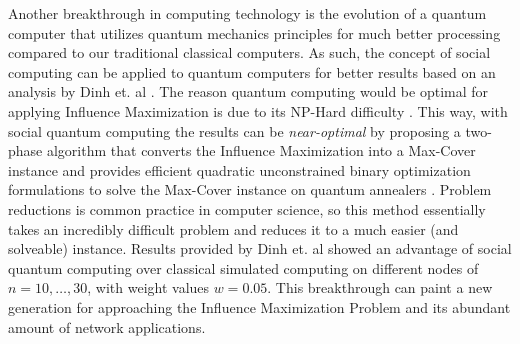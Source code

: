 \documentclass[12pt]{article}
\begin{document}
Another breakthrough in computing technology is the evolution of a quantum computer that utilizes quantum mechanics principles for much better processing compared to our traditional classical computers. 
As such, the concept of social computing can be applied to quantum computers for better results based on an analysis by Dinh et. al \cite{10000698}. 
The reason quantum computing would be optimal for applying Influence Maximization is due to its NP-Hard difficulty \cite{10000698}. 
This way, with social quantum computing the results can be \emph{near-optimal} by proposing a two-phase algorithm that converts the Influence Maximization into a Max-Cover instance and provides efficient quadratic unconstrained binary optimization formulations to solve the Max-Cover instance on quantum annealers \cite{10000698}. 
Problem reductions is common practice in computer science, so this method essentially takes an incredibly difficult problem and reduces it to a much easier (and solveable) instance. 
Results provided by Dinh et. al showed an advantage of social quantum computing over classical simulated computing on different nodes of $n=10,\ldots,30$, with weight values $w=0.05$. 
This breakthrough can paint a new generation for approaching the Influence Maximization Problem and its abundant amount of network applications.



\begin{thebibliography}{99}	%
\nocite{*}

\end{thebibliography}
\end{document}
